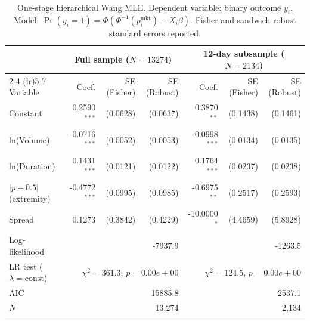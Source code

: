 \begin{table}[H]
\centering
\small
\caption{One-stage hierarchical Wang MLE. Dependent variable: binary outcome $y_i$. Model: $\Pr(y_i = 1) = \Phi(\Phi^{-1}(p_i^{\text{mkt}}) - X_i\beta)$. Fisher and sandwich robust standard errors reported.}
\label{tab:hierarchical}
\begin{tabular}{lrrrrrr}
\toprule
 & \multicolumn{3}{c}{Full sample ($N = 13274$)} & \multicolumn{3}{c}{12-day subsample ($N = 2134$)} \\
\cmidrule(lr){2-4} \cmidrule(lr){5-7}
Variable & Coef. & SE (Fisher) & SE (Robust) & Coef. & SE (Fisher) & SE (Robust) \\
\midrule
Constant & 0.2590$^{***}$ & (0.0628) & (0.0637) & 0.3870$^{**}$ & (0.1438) & (0.1461) \\
ln(Volume) & -0.0716$^{***}$ & (0.0052) & (0.0053) & -0.0998$^{***}$ & (0.0134) & (0.0135) \\
ln(Duration) & 0.1431$^{***}$ & (0.0121) & (0.0122) & 0.1764$^{***}$ & (0.0237) & (0.0238) \\
$|p - 0.5|$ (extremity) & -0.4772$^{***}$ & (0.0995) & (0.0985) & -0.6975$^{**}$ & (0.2517) & (0.2593) \\
Spread & 0.1273 & (0.3842) & (0.4229) & -10.0000$^{*}$ & (4.4659) & (5.8928) \\
\midrule
Log-likelihood & \multicolumn{3}{r}{-7937.9} & \multicolumn{3}{r}{-1263.5} \\
LR test ($\lambda = \text{const}$) & \multicolumn{3}{r}{$\chi^2 = 361.3$, $p = 0.00e+00$} & \multicolumn{3}{r}{$\chi^2 = 124.5$, $p = 0.00e+00$} \\
AIC & \multicolumn{3}{r}{15885.8} & \multicolumn{3}{r}{2537.1} \\
$N$ & \multicolumn{3}{r}{13,274} & \multicolumn{3}{r}{2,134} \\
\bottomrule
\end{tabular}
\end{table}